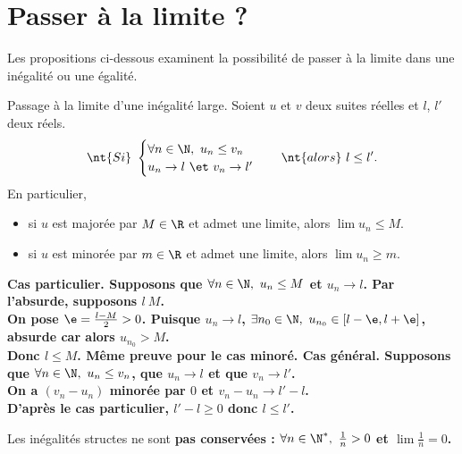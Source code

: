 \documentclass[11pt]{article}
\begin{document}
\section{Passer à la limite ?}

Les propositions ci-dessous examinent la possibilité de passer à la limite dans une inégalité ou une égalité.

\begin{prop}{Passage à la limite d'une inégalité large.}{}
    Soient $u$ et $v$ deux suites réelles et $l$, $l'$ deux réels.
    \begin{equation*}
        \nt{Si} ~ \begin{cases}\forall n \in \N, ~ u_n \leq v_n \\ u_n \to l ~\et~ v_n \to l'\end{cases} \quad \nt{alors} ~ l \leq l'.
    \end{equation*}
    En particulier,
    \begin{itemize}
        \item si $u$ est majorée par $M\in\R$ et admet une limite, alors $\lim u_n \leq M$.
        \item si $u$ est minorée par $m\in\R$ et admet une limite, alors $\lim u_n \geq m$.
    \end{itemize}
    \tcblower
    \bf{Cas particulier.} Supposons que $\forall n\in\N, ~ u_n \leq M$ et $u_n \to l$. Par l'absurde, supposons $l\> M$.\\
    On pose $\e=\frac{l-M}{2}>0$. Puisque $u_n\to l$, $\exists n_0 \in \N, ~ u_{n_0} \in [l-\e, l + \e]$, absurde car alors $u_{n_0} > M$.\\
    Donc $l\leq M$. Même preuve pour le cas minoré.\n
    \bf{Cas général.} Supposons que $\forall n \in \N, ~ u_n \leq v_n$, que $u_n \to l$ et que $v_n \to l'$.\\
    On a $(v_n - u_n)$ minorée par $0$ et $v_n-u_n \to l' - l$.\\
    D'après le cas particulier, $l'-l \geq 0$ donc $l\leq l'$.
\end{prop}

\warning Les inégalités structes ne sont \bf{pas} conservées : $\forall n \in \N^*, ~ \frac{1}{n}>0$ et $\lim\frac{1}{n}=0$.
\end{document}
